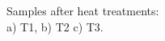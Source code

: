 \documentclass[a4paper, 11pt]{article}
\begin{document}
\begin{figure}[htp]
\centering
{} \qquad
{} \qquad
{}
\captionsetup{justification=centering}
\caption{Samples after heat treatments: \\ a) T1, b) T2  c) T3.}
\label{fig:HT}
\end{figure}
\end{document}
